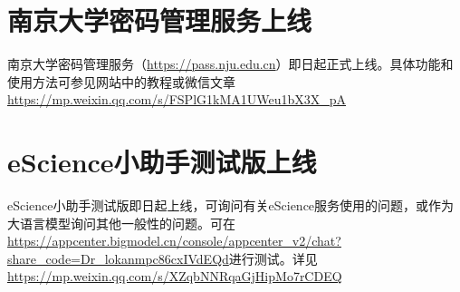 \documentclass[letterpaper, 12pt]{article}
\begin{document}
\begin{multicols}{2}
\section{南京大学密码管理服务上线}
南京大学密码管理服务（\url{https://pass.nju.edu.cn}）即日起正式上线。具体功能和使用方法可参见网站中的教程或微信文章\url{https://mp.weixin.qq.com/s/FSPlG1kMA1UWeu1bX3X_pA}
\section{eScience小助手测试版上线}
eScience小助手测试版即日起上线，可询问有关eScience服务使用的问题，或作为大语言模型询问其他一般性的问题。可在\url{https://appcenter.bigmodel.cn/console/appcenter_v2/chat?share_code=Dr_lokanmpc86cxIVdEQd}进行测试。详见\url{https://mp.weixin.qq.com/s/XZqbNNRqaGjHipMo7rCDEQ}
\end{multicols} 
\end{document}
